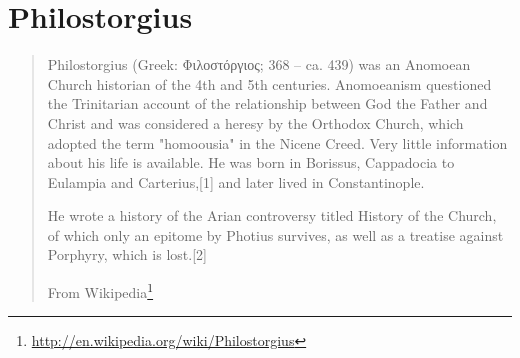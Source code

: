 \documentclass[12pt,letterpaper,twoside,final]{memoir}
\begin{document}
\section{Philostorgius}
\blockquote[From Wikipedia\footnote{\url{http://en.wikipedia.org/wiki/Philostorgius}}]{

Philostorgius (Greek: Φιλοστόργιος; 368 – ca. 439) was an Anomoean Church historian of the 4th and 5th centuries. Anomoeanism questioned the Trinitarian account of the relationship between God the Father and Christ and was considered a heresy by the Orthodox Church, which adopted the term "homoousia" in the Nicene Creed. Very little information about his life is available. He was born in Borissus, Cappadocia to Eulampia and Carterius,[1] and later lived in Constantinople.

He wrote a history of the Arian controversy titled History of the Church, of which only an epitome by Photius survives, as well as a treatise against Porphyry, which is lost.[2]}
\end{document}
